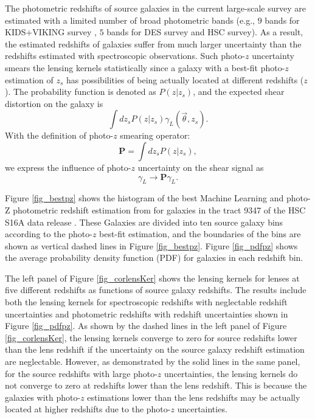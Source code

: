 The photometric redshifts of source galaxies in the current large-scale survey
are estimated with a limited number of broad photometric bands (e.g., $9$ bands
for KIDS$+$VIKING survey \citep{KIDS_VIKING-Hildebrant2020}, $5$ bands for DES
survey and HSC survey). As a result, the estimated redshifts of galaxies suffer
from much larger uncertainty than the redshifts estimated with spectroscopic
observations. Such photo-$z$ uncertainty smears the lensing kernels
statistically since a galaxy with a best-fit photo-$z$ estimation of $z_s$ has
possibilities of being actually located at different redshifts ($z$). The
probability function is denoted as $P(z|z_s)$,
and the expected shear distortion on the galaxy is
\begin{equation}\label{eq-delta2gamma-poz}
\int dz_s P(z|z_s) \gamma_L(\vec{\theta},z_s).
\end{equation}
With the definition of photo-$z$ smearing operator:
\begin{equation}
\mathbf{P} = \int dz_s P(z|z_s),
\end{equation}
we express the influence of photo-$z$ uncertainty on the shear signal as
\begin{equation}
\gamma_L \rightarrow \mathbf{P} \gamma_L.
\end{equation}

Figure \ref{fig_bestpz} shows the histogram of the best Machine Learning and
photo-Z \citep[MLZ]{MLZ-TPZ2013} photometric redshift estimation from
\cite{HSC1-photoz} for galaxies in the tract 9347 of the HSC S16A data release
\citep{HSC1-data}. These Galaxies are divided into ten source galaxy bins
according to the photo-$z$ best-fit estimation, and the boundaries of the bins are
shown as vertical dashed lines in Figure \ref{fig_bestpz}. Figure \ref{fig_pdfpz}
shows the average probability density function (PDF) for galaxies in each
redshift bin.

The left panel of Figure \ref{fig_corlensKer} shows the lensing kernels for
lenses at five different redshifts as functions of source galaxy redshifts.
The results include both the lensing kernels for spectroscopic redshifts with
neglectable redshift uncertainties and photometric redshifts with redshift
uncertainties shown in Figure \ref{fig_pdfpz}. As shown by the dashed lines in
the left panel of Figure \ref{fig_corlensKer}, the lensing kernels converge to
zero for source redshifts lower than the lens redshift if the uncertainty on
the source galaxy redshift estimation are neglectable. However, as demonstrated
by the solid lines in the same panel, for the source redshifts with large
photo-$z$ uncertainties, the lensing kernels do not converge to zero at
redshifts lower than the lens redshift. This is because the galaxies with
photo-$z$ estimations lower than the lens redshifts may be actually located at
higher redshifts due to the photo-$z$ uncertainties.

